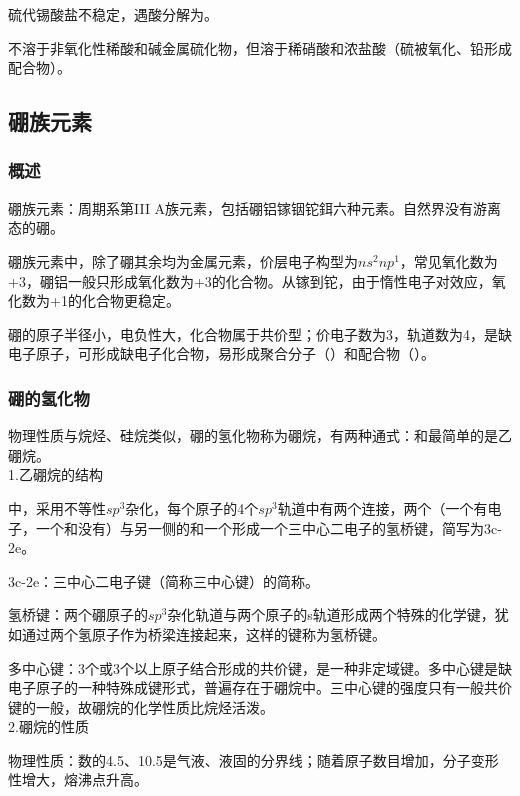 \documentclass[a4paper,UTF8]{article}
\begin{document}
硫代锡酸盐不稳定，遇酸分解为。

不溶于非氧化性稀酸和碱金属硫化物，但溶于稀硝酸和浓盐酸（硫被氧化、铅形成配合物）。

\subsection{硼族元素}

\subsubsection{概述}

硼族元素：周期系第III A族元素，包括硼铝镓铟铊鉺六种元素。自然界没有游离态的硼。

硼族元素中，除了硼其余均为金属元素，价层电子构型为$ns^2np^1$，常见氧化数为+3，硼铝一般只形成氧化数为+3的化合物。从镓到铊，由于惰性电子对效应，氧化数为+1的化合物更稳定。

硼的原子半径小，电负性大，化合物属于共价型；价电子数为3，轨道数为4，是缺电子原子，可形成缺电子化合物，易形成聚合分子（）和配合物（）。

\subsubsection{硼的氢化物}

物理性质与烷烃、硅烷类似，硼的氢化物称为硼烷，有两种通式：和最简单的是乙硼烷。\\

1.乙硼烷的结构

中，采用不等性$sp^3$杂化，每个原子的4个$sp^3$轨道中有两个连接，两个（一个有电子，一个和没有）与另一侧的和一个形成一个三中心二电子的氢桥键，简写为3c-2e。

3c-2e：三中心二电子键（简称三中心键）的简称。

氢桥键：两个硼原子的$sp^3$杂化轨道与两个原子的s轨道形成两个特殊的化学键，犹如通过两个氢原子作为桥梁连接起来，这样的键称为氢桥键。

多中心键：3个或3个以上原子结合形成的共价键，是一种非定域键。多中心键是缺电子原子的一种特殊成键形式，普遍存在于硼烷中。三中心键的强度只有一般共价键的一般，故硼烷的化学性质比烷烃活泼。\\

2.硼烷的性质

物理性质：数的4.5、10.5是气液、液固的分界线；随着原子数目增加，分子变形性增大，熔沸点升高。
\end{document}
